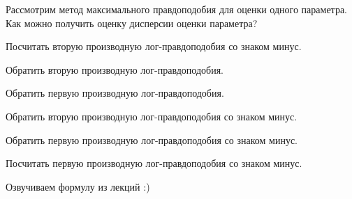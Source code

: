 
\begin{question}
Рассмотрим метод максимального правдоподобия для оценки одного параметра. Как можно получить оценку дисперсии оценки параметра?
\begin{answerlist}
  \item Посчитать вторую производную лог-правдоподобия со знаком минус.
  \item Обратить вторую производную лог-правдоподобия.
  \item Обратить первую производную лог-правдоподобия.
  \item Обратить вторую производную лог-правдоподобия со знаком минус.
  \item Обратить первую производную лог-правдоподобия со знаком минус.
  \item Посчитать первую производную лог-правдоподобия со знаком минус.
\end{answerlist}
\end{question}

\begin{solution}
Озвучиваем формулу из лекций :)
\end{solution}

